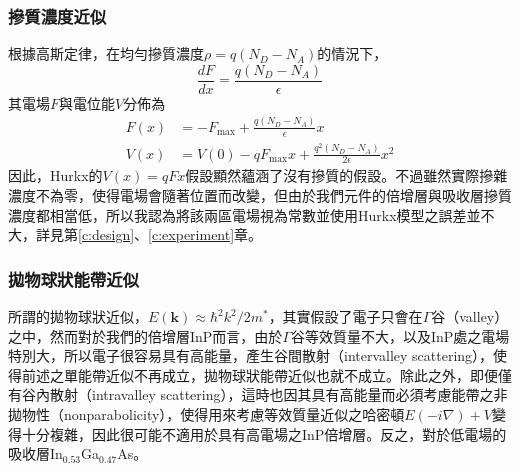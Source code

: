 \subsubsection{摻質濃度近似}
根據高斯定律，在均勻摻質濃度$\rho=q(N_D-N_A)$的情況下，
\begin{equation}
\frac{dF}{dx}=\frac{q(N_D-N_A)}{\epsilon}
\end{equation}
其電場$F$與電位能$V$分佈為
\begin{equation}
\begin{aligned}
F(x)&=-F_\text{max}+\frac{q(N_D-N_A)}{\epsilon}x\\[5pt]
V(x)&=V(0)-qF_\text{max}x+\frac{q^2(N_D-N_A)}{2\epsilon}x^2
\end{aligned}
\end{equation}
\hspace{2em}因此，Hurkx的$V(x)=qFx$假設顯然蘊涵了沒有摻質的假設。不過雖然實際摻雜濃度不為零，使得電場會隨著位置而改變，但由於我們元件的倍增層與吸收層摻質濃度都相當低，所以我認為將該兩區電場視為常數並使用Hurkx模型之誤差並不大，詳見第\ref{c:design}、\ref{c:experiment}章。
\subsubsection{拋物球狀能帶近似}
所謂的拋物球狀近似，$E(\mathbf{k})\approx\hbar^2k^2/2m^*$，其實假設了電子只會在$\Gamma$谷（valley）之中，然而對於我們的倍增層InP而言，由於$\Gamma$谷等效質量不大，以及InP處之電場特別大，所以電子很容易具有高能量，產生谷間散射（intervalley scattering），使得前述之單能帶近似不再成立，拋物球狀能帶近似也就不成立。除此之外，即便僅有谷內散射（intravalley scattering），這時也因其具有高能量而必須考慮能帶之非拋物性（nonparabolicity），使得用來考慮等效質量近似之哈密頓$E(-i\nabla)+V$變得十分複雜，因此很可能不適用於具有高電場之InP倍增層。反之，對於低電場的吸收層In$_{0.53}$Ga$_{0.47}$As。

